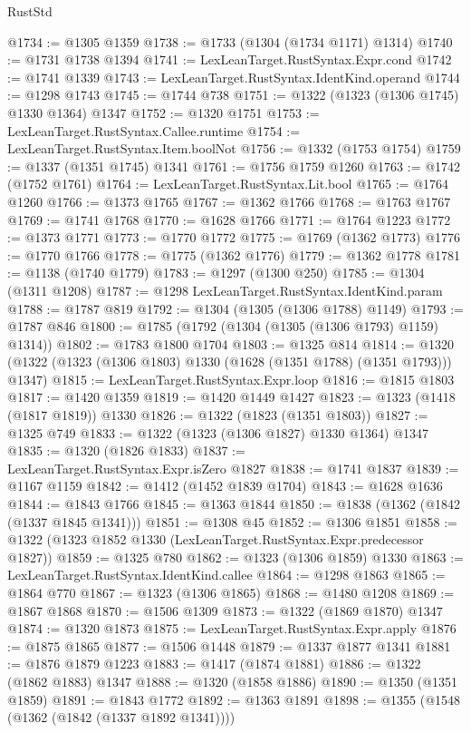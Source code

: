 \begin{lexlean}{RustStd}
\begin{coremodule}
{\begin{coremodule}
{{{{{{{{{{{{{{{{{{{{{{{{{{{{{{{{{{@1734 := @1305 @1359
@1738 := @1733 (@1304 (@1734 @1171) @1314)
@1740 := @1731 @1738 @1394
@1741 := LexLeanTarget.RustSyntax.Expr.cond
@1742 := @1741 @1339
@1743 := LexLeanTarget.RustSyntax.IdentKind.operand
@1744 := @1298 @1743
@1745 := @1744 @738
@1751 := @1322 (@1323 (@1306 @1745) @1330 @1364) @1347
@1752 := @1320 @1751
@1753 := LexLeanTarget.RustSyntax.Callee.runtime
@1754 := LexLeanTarget.RustSyntax.Item.boolNot
@1756 := @1332 (@1753 @1754)
@1759 := @1337 (@1351 @1745) @1341
@1761 := @1756 @1759 @1260
@1763 := @1742 (@1752 @1761)
@1764 := LexLeanTarget.RustSyntax.Lit.bool
@1765 := @1764 @1260
@1766 := @1373 @1765
@1767 := @1362 @1766
@1768 := @1763 @1767
@1769 := @1741 @1768
@1770 := @1628 @1766
@1771 := @1764 @1223
@1772 := @1373 @1771
@1773 := @1770 @1772
@1775 := @1769 (@1362 @1773)
@1776 := @1770 @1766
@1778 := @1775 (@1362 @1776)
@1779 := @1362 @1778
@1781 := @1138 (@1740 @1779)
@1783 := @1297 (@1300 @250)
@1785 := @1304 (@1311 @1208)
@1787 := @1298 LexLeanTarget.RustSyntax.IdentKind.param
@1788 := @1787 @819
@1792 := @1304 (@1305 (@1306 @1788) @1149)
@1793 := @1787 @846
@1800 := @1785 (@1792 (@1304 (@1305 (@1306 @1793) @1159) @1314))
@1802 := @1783 @1800 @1704
@1803 := @1325 @814
@1814 := @1320 (@1322 (@1323 (@1306 @1803) @1330 (@1628 (@1351 @1788) (@1351 @1793))) @1347)
@1815 := LexLeanTarget.RustSyntax.Expr.loop
@1816 := @1815 @1803
@1817 := @1420 @1359
@1819 := @1420 @1449 @1427
@1823 := @1323 (@1418 (@1817 @1819)) @1330
@1826 := @1322 (@1823 (@1351 @1803))
@1827 := @1325 @749
@1833 := @1322 (@1323 (@1306 @1827) @1330 @1364) @1347
@1835 := @1320 (@1826 @1833)
@1837 := LexLeanTarget.RustSyntax.Expr.isZero @1827
@1838 := @1741 @1837
@1839 := @1167 @1159
@1842 := @1412 (@1452 @1839 @1704)
@1843 := @1628 @1636
@1844 := @1843 @1766
@1845 := @1363 @1844
@1850 := @1838 (@1362 (@1842 (@1337 @1845 @1341)))
@1851 := @1308 @45
@1852 := @1306 @1851
@1858 := @1322 (@1323 @1852 @1330 (LexLeanTarget.RustSyntax.Expr.predecessor @1827))
@1859 := @1325 @780
@1862 := @1323 (@1306 @1859) @1330
@1863 := LexLeanTarget.RustSyntax.IdentKind.callee
@1864 := @1298 @1863
@1865 := @1864 @770
@1867 := @1323 (@1306 @1865)
@1868 := @1480 @1208
@1869 := @1867 @1868
@1870 := @1506 @1309
@1873 := @1322 (@1869 @1870) @1347
@1874 := @1320 @1873
@1875 := LexLeanTarget.RustSyntax.Expr.apply
@1876 := @1875 @1865
@1877 := @1506 @1448
@1879 := @1337 @1877 @1341
@1881 := @1876 @1879 @1223
@1883 := @1417 (@1874 @1881)
@1886 := @1322 (@1862 @1883) @1347
@1888 := @1320 (@1858 @1886)
@1890 := @1350 (@1351 @1859)
@1891 := @1843 @1772
@1892 := @1363 @1891
@1898 := @1355 (@1548 (@1362 (@1842 (@1337 @1892 @1341))))
}}}}}}}}}}}}}}}}}}}}}}}}}}}}}}}}}}
\end{coremodule}}
\end{coremodule}
\end{lexlean}
